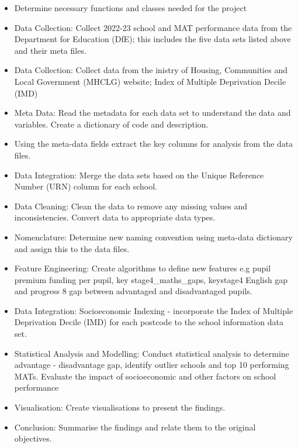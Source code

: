 \documentclass[
  letterpaper,
  DIV=11,
  numbers=noendperiod]{scrartcl}
\begin{document}
\begin{itemize}
\item
  Determine necessary functions and classes needed for the project
\item
  Data Collection: Collect 2022-23 school and MAT performance data from
  the Department for Education (DfE); this includes the five data sets
  listed above and their meta files.
\item
  Data Collection: Collect data from the inistry of Housing, Communities
  and Local Government (MHCLG) website; Index of Multiple Deprivation
  Decile (IMD)
\item
  Meta Data: Read the metadata for each data set to understand the data
  and variables. Create a dictionary of code and description.
\item
  Using the meta-data fields extract the key columns for analysis from
  the data files.
\item
  Data Integration: Merge the data sets based on the Unique Reference
  Number (URN) column for each school.
\item
  Data Cleaning: Clean the data to remove any missing values and
  inconsistencies. Convert data to appropriate data types.
\item
  Nomenclature: Determine new naming convention using meta-data
  dictionary and assign this to the data files.
\item
  Feature Engineering: Create algorithms to define new features e.g
  pupil premium funding per pupil, key stage4\_maths\_gaps, keystage4
  English gap and progress 8 gap between advantaged and disadvantaged
  pupils.
\item
  Data Integration: Socioeconomic Indexing - incorporate the Index of
  Multiple Deprivation Decile (IMD) for each postcode to the school
  information data set.
\item
  Statistical Analysis and Modelling: Conduct statistical analysis to
  determine advantage - disadvantage gap, identify outlier schools and
  top 10 performing MATs. Evaluate the impact of socioeconomic and other
  factors on school performance
\item
  Visualisation: Create visualisations to present the findings.
\item
  Conclusion: Summarise the findings and relate them to the original
  objectives.
\end{itemize}
\end{document}
